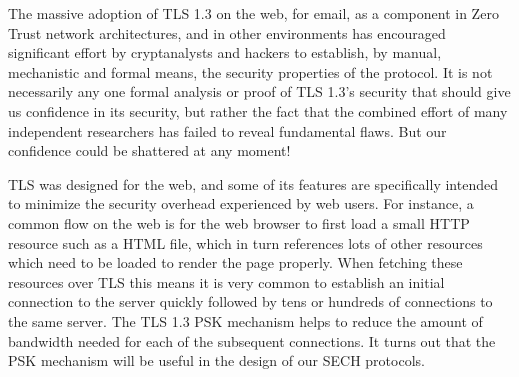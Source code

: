

The massive adoption of \ac{TLS} 1.3 on the web,
for email,
as a component in Zero Trust network architectures,
and in other environments has encouraged
significant effort by cryptanalysts
and hackers to establish, by
manual, mechanistic and formal means,
the security properties of the protocol.
It is not necessarily any one formal analysis or proof
of \ac{TLS} 1.3's security that should give us confidence in its
security, but rather the fact that the combined effort of
many independent researchers has failed to reveal
fundamental flaws.
But our confidence could be shattered at any moment!

\ac{TLS} was designed for the web, and some of its
features are specifically intended to minimize
the security overhead experienced by web users.
For instance, a common flow on the web is for the web browser
to first load a small \ac{HTTP} resource such as a \ac{HTML}
file, which in turn references lots of other resources which need
to be loaded to render the page properly.
When fetching these resources over \ac{TLS} this means it is very
common to establish an initial connection to the server
quickly followed by tens or hundreds of connections to the same server.
The \ac{TLS} 1.3 \ac{PSK} mechanism helps to reduce
the amount of bandwidth needed for each of the subsequent connections.
It turns out that the \ac{PSK} mechanism will be useful in the
design of our \ac{SECH} protocols.

